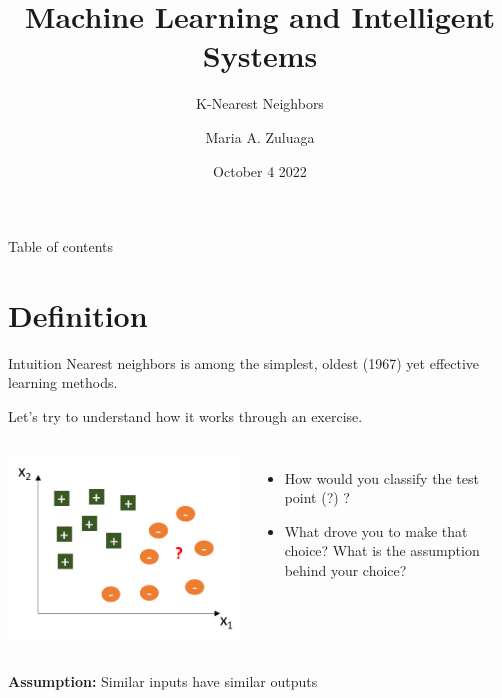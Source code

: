\documentclass[aspectratio=169,10pt]{beamer}
\title{Machine Learning and Intelligent Systems}
\subtitle{K-Nearest Neighbors}
\author{Maria A. Zuluaga}
\institute{EURECOM - Data Science Department}
\date{October 4 2022}
\begin{document}
\maketitle
\begin{frame}{Table of contents}
	\tableofcontents
\end{frame}



\section{Definition}
\begin{frame}{Intuition}
	 Nearest neighbors is among the simplest, oldest (1967) yet effective learning methods. 
	 
	 
	 Let's try to understand how it works through an exercise. 
	 \pause
	\begin{columns}
		\centering
		\includegraphics[width=0.7\textheight, clip]{images/example_hypothesis}\\
		\begin{itemize}
			\item How would you classify the test point ({\color{red}?}) ? 
			\item What drove you to make that choice? What is the assumption behind your choice?
		\end{itemize}
	\end{columns}
\centering\pause
 \textbf{Assumption:} Similar inputs have similar outputs
\end{frame}
\end{document}
